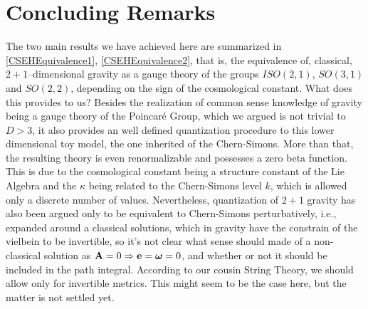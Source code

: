 \section{Concluding Remarks}

The two main results we have achieved here are summarized in \eqref{CSEHEquivalence1}, \eqref{CSEHEquivalence2}, that is, 
the equivalence of, classical, $2+1$--dimensional gravity as a gauge theory of the groups $ISO(2,1)$, $SO(3,1)$ and $SO(2,2)$, 
depending on the sign of the cosmological constant. What does this provides to us? Besides the realization 
of common sense knowledge of gravity being a gauge theory of the Poincaré Group, which we argued is not trivial to $D>3$, it also 
provides an well defined quantization procedure to this lower dimensional toy model, the one inherited of the Chern-Simons. More than 
that, the resulting theory is even renormalizable and possesses a zero beta function\cite{witten1988}. This is due to the cosmological constant being a 
structure constant of the Lie Algebra and the $\kappa$ being related to the Chern-Simons level $k$, which is allowed only a 
discrete number of values. Nevertheless, quantization of $2+1$ gravity has also been argued only 
to be equivalent to Chern-Simons perturbatively\cite{witten2007}, i.e., expanded around a classical solutions, which in gravity 
have the constrain of the vielbein to be invertible, so it's not clear what sense should made of a non-classical solution as $\vb A=0\Rightarrow\vb e=\boldsymbol\omega=0$, 
and whether or not it should be included in the path integral. According to our cousin String Theory, we should allow only for invertible metrics. 
This might seem to be the case here, but the matter is not settled yet.